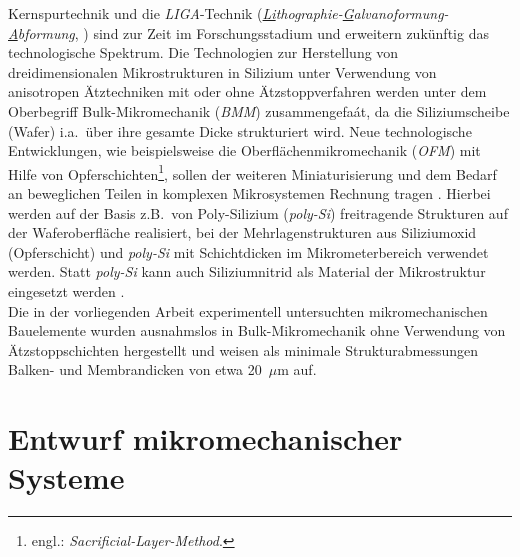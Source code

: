 Kernspurtechnik \cite{Spo90} und die {\em LIGA}-Technik
({\em \underline{Li}thographie-\underline{G}alvanoformung-\underline{A}bformung},
\cite{Bec86}) sind zur Zeit im
Forschungsstadium und erweitern zukünftig das technologische Spektrum.
Die Technologien zur Herstellung von dreidimensionalen Mikrostrukturen in
Silizium unter Verwendung von anisotropen Ätztechniken mit oder ohne
Ätzstoppverfahren
werden unter dem Oberbegriff Bulk-Mikromechanik ({\em BMM}) zusammengefaát,
da die Siliziumscheibe (Wafer) i.a.\ über ihre gesamte Dicke strukturiert
wird. Neue technologische Entwicklungen, wie beispielsweise die
Oberflächenmikromechanik ({\em OFM}) mit Hilfe von
Opferschichten\footnote{engl.: {\em Sacrificial-Layer-Method}.},
sollen der weiteren Miniaturisierung und
dem Bedarf an beweglichen Teilen in komplexen Mikrosystemen Rechnung
tragen \cite{How87, Fan87}. Hierbei werden auf der Basis z.B.\
von Poly-Silizium ({\em poly-Si})
freitragende Strukturen auf der Waferoberfläche realisiert, bei der
Mehrlagenstrukturen aus Siliziumoxid (Opferschicht) und {\em poly-Si} mit
Schichtdicken im Mikrometerbereich verwendet werden. Statt {\em poly-Si}
kann auch Siliziumnitrid als Material der Mikrostruktur eingesetzt
werden \cite{Smi92a}.\\
%
Die in der vorliegenden Arbeit experimentell untersuchten mikromechanischen
Bauelemente wurden ausnahmslos in Bulk-Mikromechanik ohne
Verwendung von Ätzstoppschichten hergestellt und weisen als minimale
Strukturabmessungen Balken- und Membrandicken von etwa 20~$\mu$m auf.


\section{Entwurf mikromechanischer Systeme}
\label{entwurf}

